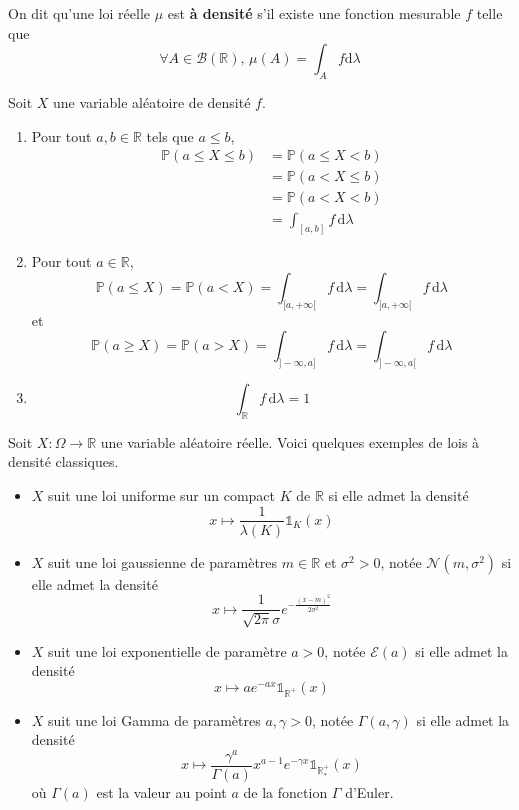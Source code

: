   \begin{definition}
    On dit qu'une loi réelle $\mu$ est \textbf{à densité} s'il existe une fonction mesurable $f$ telle que
    \[ \forall A \in \mathcal{B}(\mathbb{R}), \, \mu(A) = \int_A f \mathrm{d}\lambda \]
  \end{definition}

  \begin{proposition}
    Soit $X$ une variable aléatoire de densité $f$.
    \begin{enumerate}[label=(\roman*)]
      \item Pour tout $a, b \in \mathbb{R}$ tels que $a \leq b$,
      \begin{align*}
        \mathbb{P}(a \leq X \leq b) &= \mathbb{P}(a \leq X < b) \\
        &= \mathbb{P}(a < X \leq b) \\
        &= \mathbb{P}(a < X < b) \\
        &= \int_{[a,b]} f \, \mathrm{d}\lambda
      \end{align*}
      \item Pour tout $a \in \mathbb{R}$,
      \[ \mathbb{P}(a \leq X) = \mathbb{P}(a < X) = \int_{[a,+\infty[} f \, \mathrm{d}\lambda = \int_{]a,+\infty[} f \, \mathrm{d}\lambda \]
      et
      \[ \mathbb{P}(a \geq X) = \mathbb{P}(a > X) = \int_{]-\infty, a]} f \, \mathrm{d}\lambda = \int_{]-\infty, a[} f \, \mathrm{d}\lambda \]
      \item \[ \int_{\mathbb{R}} f \, \mathrm{d}\lambda = 1 \]
    \end{enumerate}
  \end{proposition}


  \begin{example}
    Soit $X : \Omega \rightarrow \mathbb{R}$ une variable aléatoire réelle. Voici quelques exemples de lois à densité classiques.
    \begin{itemize}
      \item $X$ suit une loi uniforme sur un compact $K$ de $\mathbb{R}$ si elle admet la densité
      \[ x \mapsto \frac{1}{\lambda(K)} \mathbb{1}_K(x) \]
      \item $X$ suit une loi gaussienne de paramètres $m \in \mathbb{R}$ et $\sigma^2 > 0$, notée $\mathcal{N}(m, \sigma^2)$ si elle admet la densité
      \[ x \mapsto \frac{1}{\sqrt{2\pi}\sigma} e^{-\frac{(x-m)^2}{2\sigma^2}} \]
      \item $X$ suit une loi exponentielle de paramètre $a > 0$, notée $\mathcal{E}(a)$ si elle admet la densité
      \[ x \mapsto a e^{-ax} \mathbb{1}_{\mathbb{R}^+}(x) \]
      \item $X$ suit une loi Gamma de paramètres $a, \gamma > 0$, notée $\Gamma(a, \gamma)$ si elle admet la densité
      \[ x \mapsto \frac{\gamma^a}{\Gamma(a)} x^{a-1} e^{-\gamma x} \mathbb{1}_{\mathbb{R}^+_*}(x) \]
      où $\Gamma(a)$ est la valeur au point $a$ de la fonction $\Gamma$ d'Euler.
    \end{itemize}
  \end{example}

